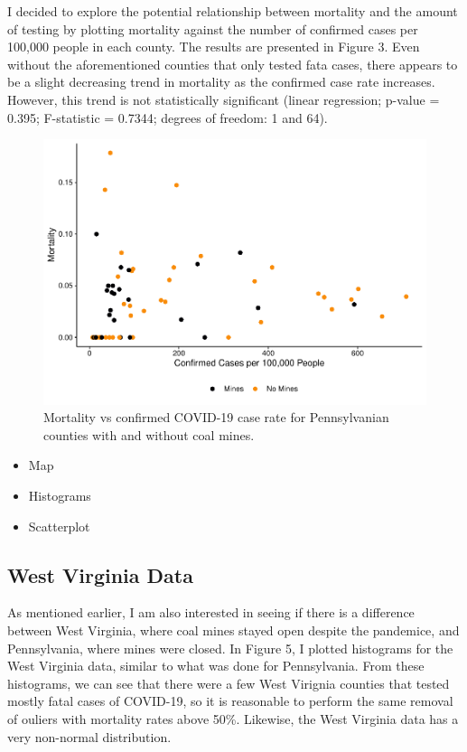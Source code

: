 \documentclass[
  12pt,
]{article}
\providecommand{\tightlist}{%
  \setlength{\itemsep}{0pt}\setlength{\parskip}{0pt}}
\begin{document}
I decided to explore the potential relationship between mortality and
the amount of testing by plotting mortality against the number of
confirmed cases per 100,000 people in each county. The results are
presented in Figure 3. Even without the aforementioned counties that
only tested fata cases, there appears to be a slight decreasing trend in
mortality as the confirmed case rate increases. However, this trend is
not statistically significant (linear regression; p-value = 0.395;
F-statistic = 0.7344; degrees of freedom: 1 and 64).

\begin{figure}
\centering
\includegraphics{Hancock_ENV872_Project_files/figure-latex/PA Mortality vs Case Rate-1.pdf}
\caption{Mortality vs confirmed COVID-19 case rate for Pennsylvanian
counties with and without coal mines.}
\end{figure}

\begin{itemize}
\tightlist
\item
  Map
\item
  Histograms
\item
  Scatterplot
\end{itemize}

\hypertarget{west-virginia-data}{%
\subsection{West Virginia Data}\label{west-virginia-data}}

As mentioned earlier, I am also interested in seeing if there is a
difference between West Virginia, where coal mines stayed open despite
the pandemice, and Pennsylvania, where mines were closed. In Figure 5, I
plotted histograms for the West Virginia data, similar to what was done
for Pennsylvania. From these histograms, we can see that there were a
few West Virignia counties that tested mostly fatal cases of COVID-19,
so it is reasonable to perform the same removal of ouliers with
mortality rates above 50\%. Likewise, the West Virginia data has a very
non-normal distribution.
\end{document}
